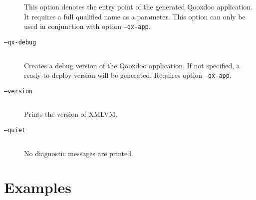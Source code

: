 \documentclass[12pt]{article}
\begin{document}
\begin{description}
  This option denotes the entry point of the generated Qooxdoo
  application. It requires a full qualified name as a parameter. This
  option can only be used in conjunction with option
  \texttt{--qx-app}.

\item[\texttt{--qx-debug}] $ $

  Creates a debug version of the Qooxdoo application.  If not
  specified, a ready-to-deploy version will be generated.  Requires
  option \texttt{--qx-app}.

\item[\texttt{--version}] $ $

  Prints the version of XMLVM.

\item[\texttt{--quiet}] $ $

  No diagnostic messages are printed.

\end{description}


\section{Examples}
\end{document}
